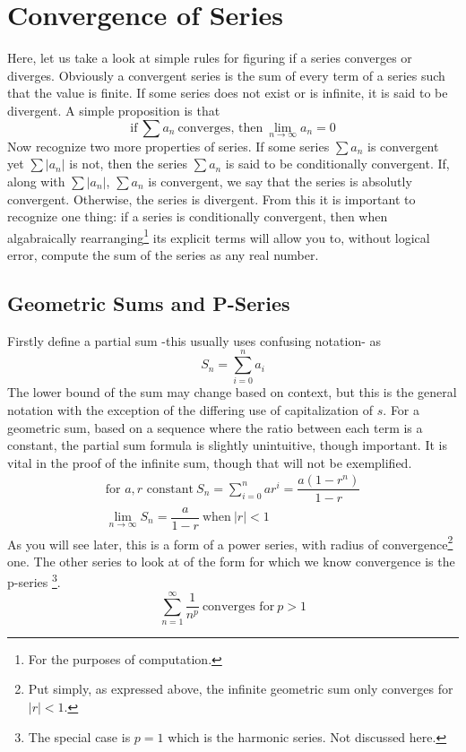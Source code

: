 \documentclass[11pt]{article}
\begin{document}
\section*{Convergence of Series}
	Here, let us take a look at simple rules for figuring if a series converges or diverges. Obviously a convergent series is the sum of
	every term of a series such that the value is finite. If some series does not exist or is infinite, it is said to be divergent.
	A simple proposition is that
		\begin{equation}
			\text{if} \ \sum a_n \ \text{converges, then} \ \lim_{n\to\infty} a_n = 0
		\end{equation}
	Now recognize two more properties of series. If some series $\sum a_n$ is convergent yet $\sum |a_n|$ is not, then the series $\sum a_n$
	is said to be conditionally convergent. If, along with $\sum |a_n|$, $\sum a_n$ is convergent, we say that the series is absolutly
	convergent. Otherwise, the series is divergent. From this it is important to recognize one thing: if a series is conditionally convergent,
	then when algabraically rearranging\footnote{For the purposes of computation.} its explicit terms will allow you to, 
	without logical error, compute the sum of the series as any real number.

	\subsection*{Geometric Sums and P-Series}
		Firstly define a partial sum -this usually uses confusing notation- as
			\begin{equation}
				S_n= \sum_{i = 0}^{n}a_i
			\end{equation}
		The lower bound of the sum may change based on context, but this is the general notation with the exception of the differing use of capitalization
		of $s$. For a geometric sum, based on a sequence where the ratio between each term is a constant, the partial sum formula is slightly unintuitive,
		though important. It is vital in the proof of the infinite sum, though that will not be exemplified.
			\begin{gather}
				\text{for $a,r$ constant} \ S_n= \sum_{i = 0}^{n} ar^i = \dfrac{a(1-r^n)}{1-r} \\
				\lim_{n\to\infty} S_n = \dfrac{a}{1-r} \ \text{when} \ |r| < 1 
			\end{gather}
		As you will see later, this is a form of a power series, with radius of convergence\footnote{Put simply, as expressed above, the infinite
		geometric sum only converges for $|r| < 1$.} one. The other series to look at of the form for which we know convergence is the p-series
		\footnote{The special case is $p = 1$ which is the harmonic series. Not discussed here.}. 
			\begin{equation}
				\sum_{n=1}^{\infty} \frac{1}{n^p} \ \text{converges for}\ p > 1
			\end{equation}
\end{document}
